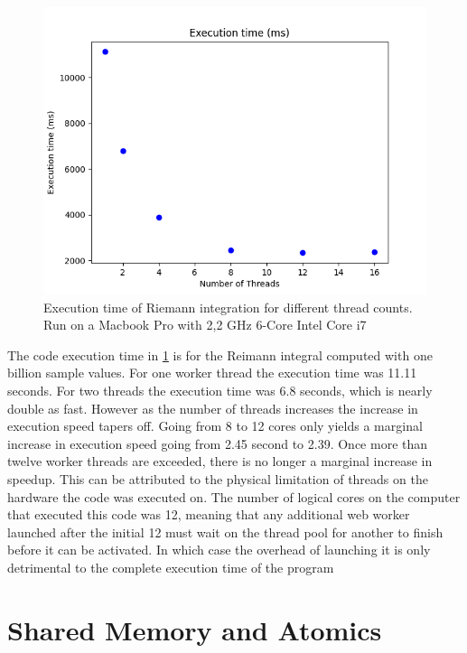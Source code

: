 \documentclass[11pt]{book}
\begin{document}
\begin{figure}[H]
\centerline{\includegraphics[width=\textwidth]{figures/integrate_exe_times.png}}
\caption{Execution time of Riemann integration for different thread counts. Run on a Macbook Pro with 2,2 GHz 6-Core Intel Core i7}
\label{png:integrate}
\end{figure}

The code execution time in \ref{png:integrate} is for the Reimann integral computed with one billion sample values. For one worker thread the execution time was 11.11 seconds. For two threads the execution time was 6.8 seconds, which is nearly double as fast. However as the number of threads increases the increase in execution speed tapers off. Going from 8 to 12 cores only yields a marginal increase in execution speed going from 2.45 second to 2.39. Once more than twelve worker threads are exceeded, there is no longer a marginal increase in speedup. This can be attributed to the physical limitation of threads on the hardware the code was executed on. The number of logical cores on the computer that executed this code was 12, meaning that any additional web worker launched after the initial 12 must wait on the thread pool for another to finish before it can be activated. In which case the overhead of launching it is only detrimental to the complete execution time of the program


\section{Shared Memory and Atomics}
\end{document}
